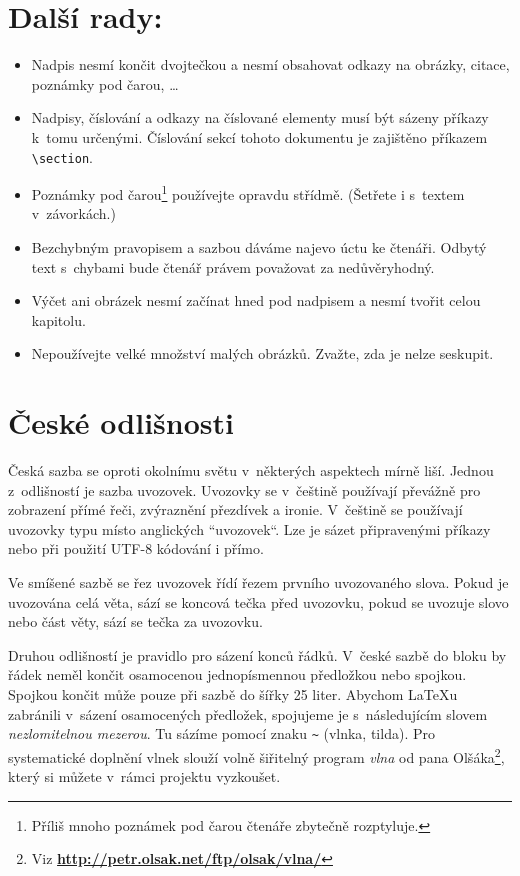 \documentclass[a4paper, twocolumn, 10pt]{article}
\begin{document}
\section{Další rady:}\label{sec:dalsi_rady}

\begin{itemize}

    \item   Nadpis nesmí končit dvojtečkou a nesmí obsahovat odkazy na obrázky, citace, poznámky pod čarou, \dots
    \item  Nadpisy, číslování a odkazy na číslované elementy musí být sázeny příkazy k~tomu určenými. Číslování sekcí tohoto dokumentu je zajištěno příkazem \verb|\section|.
    \item Poznámky pod čarou\footnote{Příliš mnoho poznámek pod čarou čtenáře zbytečně rozptyluje.} používejte opravdu střídmě. (Šetřete i s~textem v~závorkách.)
    \item Bezchybným pravopisem a sazbou dáváme najevo úctu ke čtenáři. Odbytý text s~chybami bude čtenář právem považovat za nedůvěryhodný.
    \item Výčet ani obrázek nesmí začínat hned pod nadpisem a nesmí tvořit celou kapitolu.
    \item Nepoužívejte velké množství malých obrázků. Zvažte, zda je nelze seskupit.
    
\end{itemize}

\section{České odlišnosti}
    Česká sazba se oproti okolnímu světu v~některých aspektech mírně liší. Jednou z~odlišností je sazba uvozovek. Uvozovky se v~češtině používají převážně pro zobrazení přímé řeči, zvýraznění přezdívek a ironie. V~češtině se používají uvozovky typu  místo anglických ``uvozovek``. Lze je sázet připravenými příkazy nebo při použití UTF-8 kódování i přímo.
    
    Ve smíšené sazbě se řez uvozovek řídí řezem prvního uvozovaného slova. Pokud je uvozována celá věta, sází se koncová tečka před uvozovku, pokud se uvozuje slovo nebo část věty, sází se tečka za uvozovku.
    
    Druhou odlišností je pravidlo pro sázení konců řádků. V~české sazbě do bloku by řádek neměl končit osamocenou jednopísmennou předložkou nebo spojkou. Spojkou  končit může pouze při sazbě do šířky 25 liter. Abychom \LaTeX u zabránili v~sázení osamocených předložek, spojujeme je s~následujícím slovem \emph{nezlomitelnou mezerou}. Tu sázíme pomocí znaku \verb|~| (vlnka, tilda). Pro systematické doplnění vlnek slouží volně šiřitelný program \emph{vlna} od pana Olšáka\footnote{Viz \textbf{\url{http://petr.olsak.net/ftp/olsak/vlna/}}}, který si můžete v~rámci projektu vyzkoušet.
    
\end{document}
